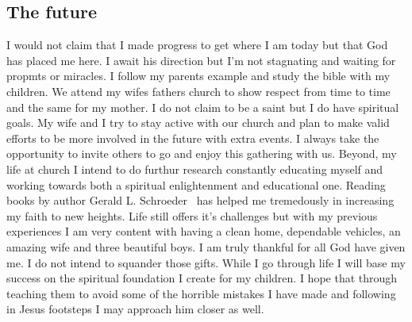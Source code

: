 \documentclass[11pt,a4paper]{scrartcl} %
\begin{document}
\begin{doublespace}
\subsection{The future}
I would not claim that I made progress to get where I am today but that God has placed me here. I await his direction but I'm not stagnating and waiting for propmts or miracles. I follow my parents example and study the bible with my children. We attend my wifes fathers church to show respect from time to time and the same for my mother. I do not claim to be a saint but I do have spiritual goals. My wife and I try to stay active with our church and plan to make valid efforts to be more involved in the future with extra events. I always take the opportunity to invite others to go and enjoy this gathering with us. Beyond, my life at church I intend to do furthur research constantly educating myself and working towards both a spiritual enlightenment and educational one. Reading books by author Gerald L. Schroeder~\cite{gerald-2009} has helped me tremedously in increasing my faith to new heights. Life still offers it's challenges but with my previous experiences I am very content with having a clean home, dependable vehicles, an amazing wife and three beautiful boys. I am truly thankful for all God have given me. I do not intend to squander those gifts. While I go through life I will base my success on the spiritual foundation I create for my children. I hope that through teaching them to avoid some of the horrible mistakes I have made and following in Jesus footsteps I may approach him closer as well.

\end{doublespace}
\clearpage
    \nocite{*}
    
    
\end{document}
